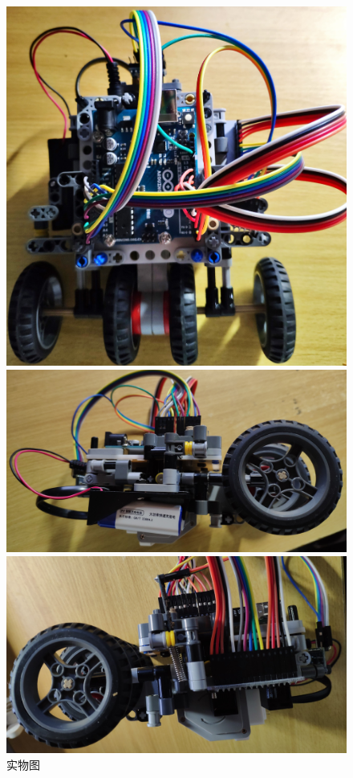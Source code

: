 \documentclass[a4paper]{ctexart}
\begin{document}
\begin{spacing}{1.5}
\begin{figure}[htbp]
\begin{minipage}[t]{0.524\textwidth}
	\includegraphics[width=\textwidth]{figure//F2.jpg}
\end{minipage}
\begin{minipage}[t]{0.52\textwidth}
\centering
\includegraphics[width=\textwidth]{figure//F3.jpg}
\end{minipage}%
\hfill
\begin{minipage}[t]{0.48\textwidth}
\centering
\includegraphics[width=\textwidth]{figure//F4.jpg}
\end{minipage}
\caption{实物图}\label{frame}
\end{figure}

\end{spacing}
\end{document}
